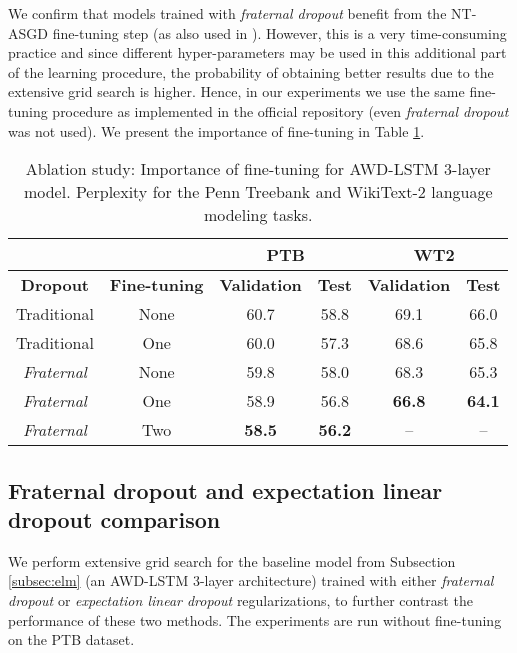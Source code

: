 \documentclass{article} \usepackage{iclr2018_conference,times}
\begin{document}
We confirm that models trained with \emph{fraternal dropout} benefit from the NT-ASGD fine-tuning step (as also used in \citet{merity2017regularizing}). However, this is a very time-consuming practice and since different hyper-parameters may be used in this additional part of the learning procedure, the probability of obtaining better results due to the extensive grid search is higher. Hence, in our experiments we use the same fine-tuning procedure as implemented in the official repository (even \emph{fraternal dropout} was not used). We present the importance of fine-tuning in Table \ref{table:finetuning}.

\begin{table}[t]
\vspace{-0.08cm}
\centering
\begin{tabular}{ c|c|c|c|c|c }
  \multicolumn{2}{c|}{}& \multicolumn{2}{c|}{\textbf{PTB}} & \multicolumn{2}{c}{\textbf{WT2}}\\
  \hline
  \textbf{Dropout} & \textbf{Fine-tuning} & \textbf{Validation} & \textbf{Test} & \textbf{Validation} & \textbf{Test}\\
  \hline
  Traditional & None & 60.7 & 58.8 & 69.1 & 66.0\\
  Traditional & One & 60.0 & 57.3 & 68.6 & 65.8\\
  \hline
  \emph{Fraternal} & None & 59.8 & 58.0 & 68.3 & 65.3\\
  \emph{Fraternal} & One & 58.9 & 56.8 & \textbf{66.8} & \textbf{64.1}\\
  \emph{Fraternal} & Two & \textbf{58.5} & \textbf{56.2} & -- & --\\
\end{tabular}
\caption{Ablation study: Importance of fine-tuning for AWD-LSTM 3-layer model. Perplexity for the Penn Treebank and WikiText-2 language modeling tasks.}
\label{table:finetuning}
\vspace{-0.08cm}
\end{table}

\subsection{Fraternal dropout and expectation linear dropout comparison}\label{FDvsELD}

We perform extensive grid search for the baseline model from Subsection \ref{subsec:elm} (an AWD-LSTM 3-layer architecture) trained with either \emph{fraternal dropout} or \emph{expectation linear dropout} regularizations, to further contrast the performance of these two methods. The experiments are run without fine-tuning on the PTB dataset.
\end{document}
